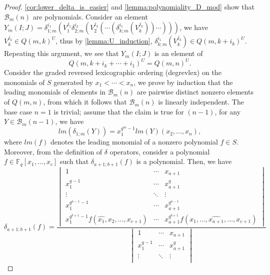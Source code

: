 \documentclass[12pt,a4paper]{report}
\theoremstyle{definition}
\theoremstyle{remark}
\theoremstyle{definition}
\begin{document}
\begin{proof}
    \cref{cor:lower_delta_is_easier} and \cref{lemma:polynomiality_D_mod} show that $\mathcal{B}_m(n)$ are polynomials. Consider an element $Y_m(I;J) = \delta_{1; m}^{i_1}(V_1^{j_1}\delta_{2; m}^{i_2}(V_2^{j_2}(\cdots (\delta_{k; m}^{i_1}(V_k^{j_k}))\cdots )))$, we have $V_k^{j_k}\in Q(m, k)^{U}$, thus by \cref{lemma:U_induction}, $\delta_{k; m}^{i_1}(V_k^{j_k})\in Q(m, k+i_k)^{U}$. Repeating this argument, we see that $Y_m(I; J)$ is an element of 
    \begin{equation*}
        Q(m, k+i_k + \cdots + i_1)^U = Q(m, n)^U.
    \end{equation*}  
    Consider the graded reversed lexicographic ordering (degrevlex) on the monomials of $S$ generated by $x_1<\cdots <x_n$, we prove by induction that the leading monomials of elements in $\mathcal{B}_{m}(n)$ are pairwise distinct nonzero elements of $Q(m, n)$, from which it follows that $\mathcal{B}_m(n)$ is linearly independent. The base case $n=1$ is trivial; assume that the claim is true for $(n-1)$, for any $Y\in \mathcal{B}_m(n-1)$, we have
    \begin{equation*}
        lm(\delta_{1;m}(Y)) = x_1^{q^m-1}lm(Y)(x_2, \ldots, x_n),
    \end{equation*}
    where $lm(f)$ denotes the leading monomial of a nonzero polynomial $f\in S$. Moreover, from the definition of $\delta$ operators, consider a polynomial $f\in \mathbb{F}_q[x_1, \ldots, x_c]$ such that $\delta_{a+1;b+1}(f)$ is a polynomial. Then, we have
    \begin{equation*}
       \delta_{a+1;b+1}(f) = \dfrac{\begin{vmatrix}
            1 & \cdots & x_{a+1}\\
            x_1^{q-1} & \cdots & x_{a+1}^q\\
            \vdots & \ddots & \vdots\\
            x_1^{q^{a-1}-1} & \cdots  & x_{a+1}^{q^{a-1}}\\
            x_1^{q^{b+1}-1}f(\widehat{x_1}, x_2, \ldots, x_{c+1}) & \cdots  & x_{a+1}^{q^{b+1}}f(x_1, \ldots, \widehat{x_{a+1}}, \ldots, x_{c+1})
        \end{vmatrix}}{\begin{vmatrix}
            1 & \cdots & x_{a+1}\\
            x_1^{q-1} & \cdots & x_{a+1}^q\\
            \vdots & \ddots & \vdots\\

\end{vmatrix}}
\end{equation*}
\end{proof}
\end{document}
